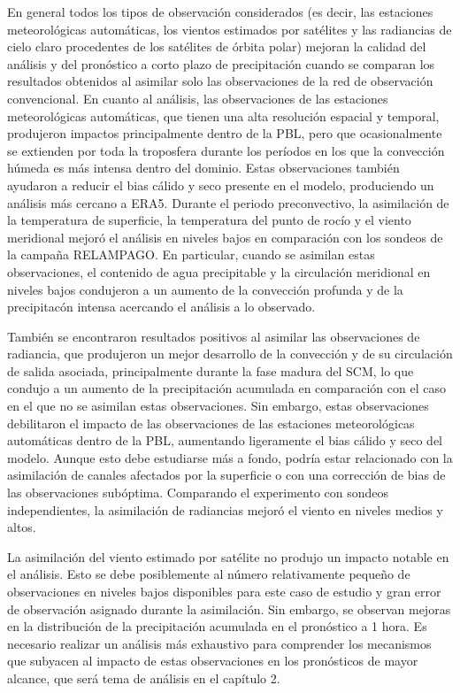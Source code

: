 \documentclass[12pt,oneside,a4paper]{reedthesis}
\begin{document}
En general todos los tipos de observación considerados (es decir, las estaciones meteorológicas automáticas, los vientos estimados por satélites y las radiancias de cielo claro procedentes de los satélites de órbita polar) mejoran la calidad del análisis y del pronóstico a corto plazo de precipitación cuando se comparan los resultados obtenidos al asimilar solo las observaciones de la red de observación convencional. En cuanto al análisis, las observaciones de las estaciones meteorológicas automáticas, que tienen una alta resolución espacial y temporal, produjeron impactos principalmente dentro de la PBL, pero que ocasionalmente se extienden por toda la troposfera durante los períodos en los que la convección húmeda es más intensa dentro del dominio. Estas observaciones también ayudaron a reducir el bias cálido y seco presente en el modelo, produciendo un análisis más cercano a ERA5. Durante el periodo preconvectivo, la asimilación de la temperatura de superficie, la temperatura del punto de rocío y el viento meridional mejoró el análisis en niveles bajos en comparación con los sondeos de la campaña RELAMPAGO. En particular, cuando se asimilan estas observaciones, el contenido de agua precipitable y la circulación meridional en niveles bajos condujeron a un aumento de la convección profunda y de la precipitacón intensa acercando el análisis a lo observado.

También se encontraron resultados positivos al asimilar las observaciones de radiancia, que produjeron un mejor desarrollo de la convección y de su circulación de salida asociada, principalmente durante la fase madura del SCM, lo que condujo a un aumento de la precipitación acumulada en comparación con el caso en el que no se asimilan estas observaciones. Sin embargo, estas observaciones debilitaron el impacto de las observaciones de las estaciones meteorológicas automáticas dentro de la PBL, aumentando ligeramente el bias cálido y seco del modelo. Aunque esto debe estudiarse más a fondo, podría estar relacionado con la asimilación de canales afectados por la superficie o con una corrección de bias de las observaciones subóptima. Comparando el experimento con sondeos independientes, la asimilación de radiancias mejoró el viento en niveles medios y altos.

La asimilación del viento estimado por satélite no produjo un impacto notable en el análisis. Esto se debe posiblemente al número relativamente pequeño de observaciones en niveles bajos disponibles para este caso de estudio y gran error de observación asignado durante la asimilación. Sin embargo, se observan mejoras en la distribución de la precipitación acumulada en el pronóstico a 1 hora. Es necesario realizar un análisis más exhaustivo para comprender los mecanismos que subyacen al impacto de estas observaciones en los pronósticos de mayor alcance, que será tema de análisis en el capítulo 2.
\end{document}
